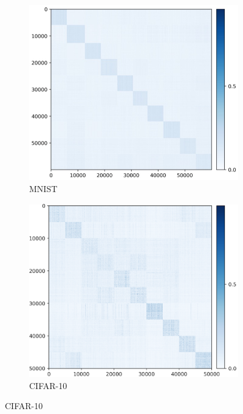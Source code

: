 \documentclass[../../book-main.tex]{subfiles}
\begin{document}
\begin{figure}[t]
    \begin{subfigure}[t]{0.3\textwidth}
        \centering
        \includegraphics[width=\textwidth]{chapters/chapter5/figs/MNIST_MNIST_ZZhat_heatmap_epo200.png}
        \caption{MNIST}
    \end{subfigure}
    \hfill
    \begin{subfigure}[t]{0.3\textwidth}
        \centering
        \includegraphics[width=\textwidth]{chapters/chapter5/figs/cifar_heatmat_cifar.png}
        \caption{CIFAR-10}

\end{subfigure}
\end{figure}
\end{document}
